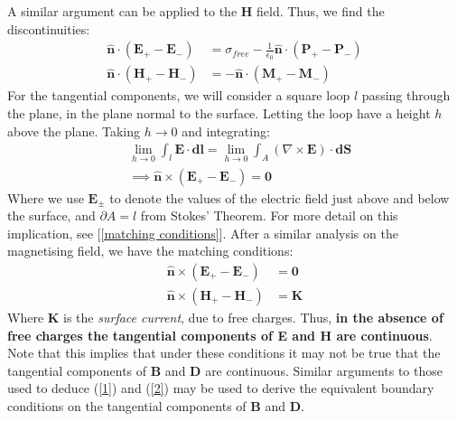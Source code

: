 \documentclass[a4paper]{article}
\numberwithin{equation}{section}
\begin{document}
A similar argument can be applied to the $\mathbf{H}$ field. Thus, we find the discontinuities:
\begin{align}
\hat{\mathbf{n}} \cdot (\mathbf{E}_+-\mathbf{E}_-) &= \sigma_{free} -\frac{1}{\epsilon_0} \hat{\mathbf{n}} \cdot (\mathbf{P}_+ - \mathbf{P}_-) \label{1} \\
\hat{\mathbf{n}} \cdot (\mathbf{H}_+-\mathbf{H}_-) &= - \hat{\mathbf{n}} \cdot (\mathbf{M}_+ - \mathbf{M}_-) \label{2}
\end{align}
For the tangential components, we will consider a square loop $l$ passing through the plane, in the plane normal to the surface. Letting the loop have a height $h$ above the plane. Taking $h\rightarrow 0$ and integrating:
\begin{align*}
&\lim_{h \rightarrow 0} \int_l \mathbf{E} \cdot \mathbf{dl} = \lim_{h \rightarrow 0}\int_A(\nabla \times \mathbf{E}) \cdot \mathbf{dS} \\
&\implies \hat{\mathbf{n}} \times (\mathbf{E}_+ - \mathbf{E}_-)= \mathbf{0}
\end{align*}
Where we use $\mathbf{E}_\pm$ to denote the values of the electric field just above and below the surface, and $\partial A = l$ from Stokes' Theorem. For more detail on this implication, see [\ref{matching conditions}]. After a similar analysis on the magnetising field, we have the matching conditions:
\begin{align}
\hat{\mathbf{n}} \times (\mathbf{E}_+ - \mathbf{E}_-)&= \mathbf{0} \\
\hat{\mathbf{n}} \times (\mathbf{H}_+ - \mathbf{H}_-)&= \mathbf{K}
\end{align}
Where $\mathbf{K}$ is the \textit{surface current}, due to free charges. Thus, \textbf{in the absence of free charges the tangential components of E and H are continuous}. Note that this implies that under these conditions it may not be true that the tangential components of $\mathbf{B}$ and $\mathbf{D}$ are continuous. Similar arguments to those used to deduce (\ref{1}) and (\ref{2}) may be used to derive the equivalent boundary conditions on the tangential components of $\mathbf{B}$ and $\mathbf{D}$.
\end{document}
